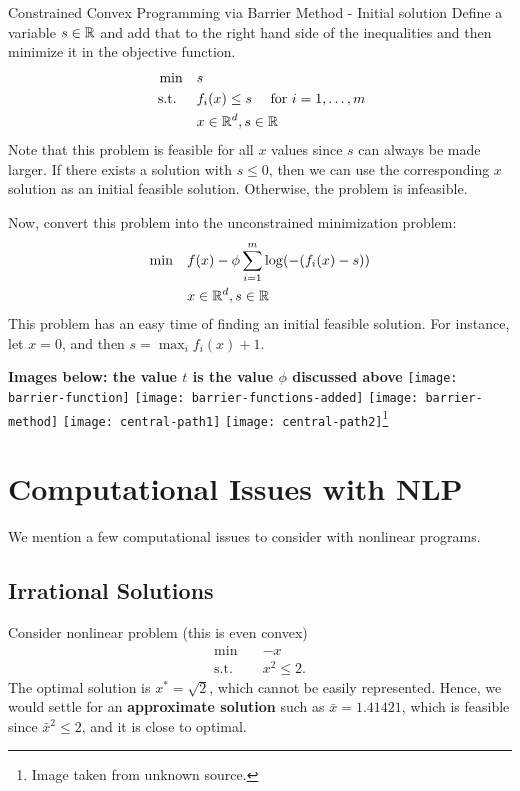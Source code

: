 \documentclass[../open-optimization/open-optimization.tex]{subfiles}
\begin{document}
\begin{general}{Constrained Convex Programming via Barrier Method - Initial solution}{}
Define a variable $s \in {\mathbb{R}}$ and add that to the right hand side of the inequalities and then minimize it in the objective function.
\begin{equation}
\label{eq:convex-programming}
\begin{split}
\min \quad & s\\
\text{ s.t. }  \quad & f_i(x) \leq s \quad  \text{ for } i=1, \dots, m\\
& x \in {\mathbb{R}}^d, s \in {\mathbb{R}}
\end{split}
\end{equation}
Note that this problem is feasible for all $x$ values since $s$ can always be made larger.  
If there exists a solution with $s \leq 0$, then we can use the corresponding $x$ solution as an initial feasible solution.  Otherwise, the problem is infeasible.

Now, convert this problem into the unconstrained minimization problem:
\begin{equation}
\label{eq:convex-programming}
\begin{split}
\min \quad & f(x) - \phi \sum_{i=1}^m \log(-(f_i(x)-s)) \\
& x \in {\mathbb{R}}^d, s \in {\mathbb{R}}
\end{split}
\end{equation}
This problem has an easy time of finding an initial feasible solution.  For instance, let $x = 0$, and then $s = \max_i f_i(x) +1 $.  
\end{general}


\textbf{Images below: the value $t$ is the value $\phi$ discussed above}
\texttt{[image: barrier-function]}
\texttt{[image: barrier-functions-added]}
\texttt{[image: barrier-method]}
\texttt{[image: central-path1]}
\texttt{[image: central-path2]}\footnote{Image taken from unknown source.}


\chapter{Computational Issues with NLP}
We mention a few computational issues to consider with nonlinear programs.  
\section{Irrational Solutions}
Consider nonlinear problem (this  is even convex)
\begin{equation}
\begin{array}{rl}
\min \quad & -x\\
\text{s.t.} \quad & x^2 \leq 2.
\end{array}
\end{equation}
The optimal solution is $x^* = \sqrt{2}$, which cannot be easily represented.  Hence, we would settle for an \textbf{approximate solution} such as $\bar x = 1.41421$, which is feasible since $\bar x^2 \leq 2$, and it is close to optimal.
\end{document}
